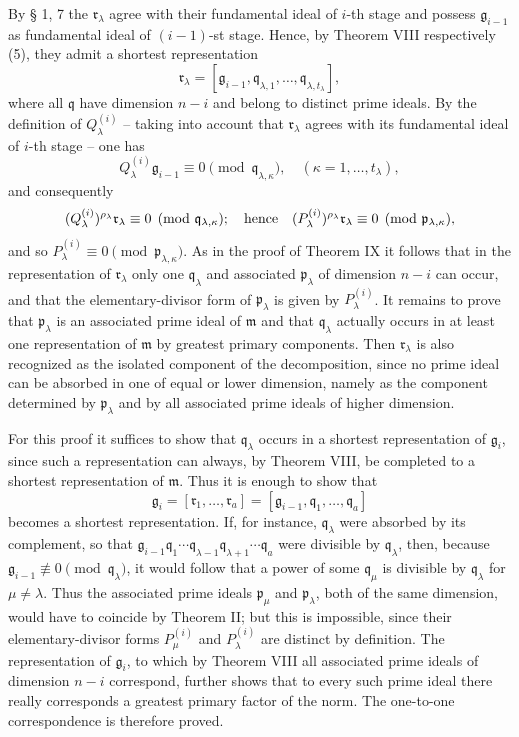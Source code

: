 \documentclass[11pt]{article}
\providecommand{\frakm}{\mathfrak m}
\providecommand{\frakp}{\mathfrak p}
\providecommand{\frakq}{\mathfrak q}
\providecommand{\frakr}{\mathfrak r}
\providecommand{\frakg}{\mathfrak g}
\begin{document}
By § 1, 7 the $\frakr_\lambda$ agree with their fundamental ideal of $i$-th stage and possess $\frakg_{i-1}$ as fundamental ideal of $(i-1)$-st stage. Hence, by Theorem VIII respectively (5), they admit a shortest representation
\[
 \frakr_\lambda=[\frakg_{i-1},\frakq_{\lambda,1},\ldots,\frakq_{\lambda,t_\lambda}],
\]
where all $\frakq$ have dimension $n-i$ and belong to distinct prime ideals. By the definition of $Q_\lambda^{(i)}$ -- taking into account that $\frakr_\lambda$ agrees with its fundamental ideal of $i$-th stage -- one has
\[
 Q_\lambda^{(i)}\frakg_{i-1}\equiv0\pmod{\frakq_{\lambda,\kappa}},
 \quad(\kappa=1,\ldots,t_\lambda),
\]
and consequently
\[
 (Q_\lambda^{(i)})^{\rho_\lambda}\frakr_\lambda\equiv0\pmod{\frakq_{\lambda,\kappa}};
 \quad\hbox{hence}\quad
 (P_\lambda^{(i)})^{\rho_\lambda}\frakr_\lambda\equiv0\pmod{\frakp_{\lambda,\kappa}},
\]
and so $P_\lambda^{(i)}\equiv0\pmod{\frakp_{\lambda,\kappa}}$. As in the proof of Theorem IX it follows that in the representation of $\frakr_\lambda$ only one $\frakq_\lambda$ and associated $\frakp_\lambda$ of dimension $n-i$ can occur, and that the elementary-divisor form of $\frakp_\lambda$ is given by $P_\lambda^{(i)}$. It remains to prove that $\frakp_\lambda$ is an associated prime ideal of $\frakm$ and that $\frakq_\lambda$ actually occurs in at least one representation of $\frakm$ by greatest primary components. Then $\frakr_\lambda$ is also recognized as the isolated component of the decomposition, since no prime ideal can be absorbed in one of equal or lower dimension, namely as the component determined by $\frakp_\lambda$ and by all associated prime ideals of higher dimension.

For this proof it suffices to show that $\frakq_\lambda$ occurs in a shortest representation of $\frakg_i$, since such a representation can always, by Theorem VIII, be completed to a shortest representation of $\frakm$. Thus it is enough to show that
\[
 \frakg_i=[\frakr_1,\ldots,\frakr_a]=[\frakg_{i-1},\frakq_1,\ldots,\frakq_a]
\]
becomes a shortest representation. If, for instance, $\frakq_\lambda$ were absorbed by its complement, so that $\frakg_{i-1}\frakq_1\cdots\frakq_{\lambda-1}\frakq_{\lambda+1}\cdots\frakq_a$ were divisible by $\frakq_\lambda$, then, because $\frakg_{i-1}\not\equiv0\pmod{\frakq_\lambda}$, it would follow that a power of some $\frakq_\mu$ is divisible by $\frakq_\lambda$ for $\mu\ne\lambda$. Thus the associated prime ideals $\frakp_\mu$ and $\frakp_\lambda$, both of the same dimension, would have to coincide by Theorem II; but this is impossible, since their elementary-divisor forms $P_\mu^{(i)}$ and $P_\lambda^{(i)}$ are distinct by definition. The representation of $\frakg_i$, to which by Theorem VIII all associated prime ideals of dimension $n-i$ correspond, further shows that to every such prime ideal there really corresponds a greatest primary factor of the norm. The one-to-one correspondence is therefore proved.
\end{document}
